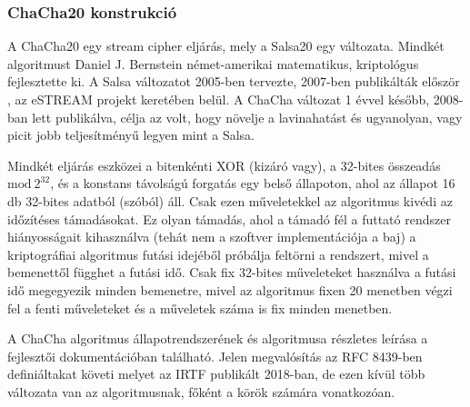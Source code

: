 \documentclass[12pt]{article}
\begin{document}
	\subsubsection{ChaCha20 konstrukció}
	A ChaCha20 egy stream cipher eljárás, mely a Salsa20 egy változata. Mindkét algoritmust Daniel J. Bernstein német-amerikai matematikus, kriptológus fejlesztette ki. A Salsa változatot 2005-ben tervezte, 2007-ben publikálták először \cite{salsa}, az eSTREAM projekt keretében belül. A ChaCha változat 1 évvel később, 2008-ban lett publikálva, célja az volt, hogy növelje a lavinahatást és ugyanolyan, vagy picit jobb teljesítményű legyen mint a Salsa. \cite{chacha}
	
	Mindkét eljárás eszközei a bitenkénti XOR (kizáró vagy), a 32-bites összeadás $\textrm{mod}\ 2^{32}$, és a konstans távolságú forgatás egy belső állapoton, ahol az állapot 16 db 32-bites adatból (szóból) áll. Csak ezen műveletekkel az algoritmus kivédi az időzítéses támadásokat. Ez olyan támadás, ahol a támadó fél a futtató rendszer hiányosságait kihasználva (tehát nem a szoftver implementációja a baj) a kriptográfiai algoritmus futási idejéből próbálja feltörni a rendszert, mivel a bemenettől függhet a futási idő. Csak fix 32-bites műveleteket használva a futási idő megegyezik minden bemenetre, mivel az algoritmus fixen 20 menetben végzi fel a fenti műveleteket és a műveletek száma is fix minden menetben.
	
	A ChaCha algoritmus állapotrendszerének és algoritmusa részletes leírása a fejlesztői dokumentációban található. Jelen megvalósítás az RFC 8439-ben \cite{RFC} definiáltakat követi melyet az IRTF publikált 2018-ban, de ezen kívül több változata van az algoritmusnak, főként a körök számára vonatkozóan.
	
\end{document}
